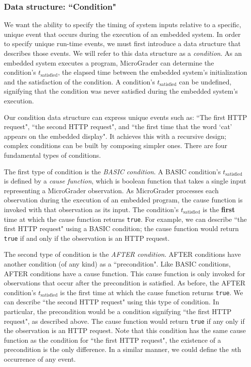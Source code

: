 \documentclass[12pt]{article}
\begin{document}
\subsubsection{Data structure: ``Condition"}
\label{sec:condition}
We want the ability to specify the timing of system inputs relative to a specific, unique event that occurs during the execution of an embedded system.  In order to specify unique run-time events, we must first introduce a data structure that describes those events.  We will refer to this data structure as a \textit{condition}.  As an embedded system executes a program, MicroGrader can determine the condition's $t_{\text{satisfied}}$, the elapsed time between the embedded system's initialization and the satisfaction of the condition.  A condition's $t_{\text{satisfied}}$ can be undefined, signifying that the condition was never satisfied during the embedded system's execution.

Our condition data structure can express unique events such as: ``The first HTTP request", ``the second HTTP request", and ``the first time that the word `cat' appears on the embedded display".  It achieves this with a recursive design; complex conditions can be built by composing simpler ones.  There are four fundamental types of conditions.

The first type of condition is the \textit{BASIC condition}.  A BASIC condition's $t_{\text{satisfied}}$ is defined by a \textit{cause function}, which is boolean function that takes a single input representing a MicroGrader observation.  As MicroGrader processes each observation during the execution of an embedded program, the cause function is invoked with that observation as its input.  The condition's $t_{\text{satisfied}}$ is the \textbf{first} time at which the cause function returns \texttt{true}.  For example, we can describe ``the first HTTP request" using a BASIC condition; the cause function would return \texttt{true} if and only if the observation is an HTTP request.

The second type of condition is the \textit{AFTER condition}.  AFTER conditions have another condition (of any kind) as a ``precondition".  Like BASIC conditions, AFTER conditions have a cause function.  This cause function is only invoked for observations that occur after the precondition is satisfied.  As before, the AFTER condition's $t_{\text{satisfied}}$ is the first time at which the cause function returns \texttt{true}.  We can describe ``the second HTTP request" using this type of condition.  In particular, the precondition would be a condition signifying ``the first HTTP request", as described above.  The cause function would return \texttt{true} if any only if the observation is an HTTP request.  Note that this condition has the same cause function as the condition for ``the first HTTP request", the existence of a precondition is the only difference.  In a similar manner, we could define the \textit{n}th occurrence of any event.
\end{document}
